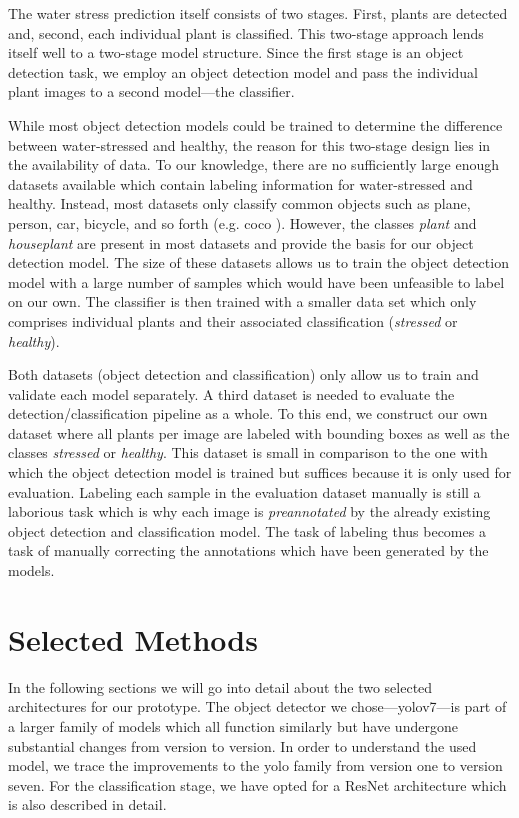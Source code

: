 \documentclass[final]{vutinfth} %
\begin{document}
The water stress prediction itself consists of two stages. First,
plants are detected and, second, each individual plant is
classified. This two-stage approach lends itself well to a two-stage
model structure. Since the first stage is an object detection task, we
employ an object detection model and pass the individual plant images
to a second model---the classifier.

While most object detection models could be trained to determine the
difference between water-stressed and healthy, the reason for this
two-stage design lies in the availability of data. To our knowledge,
there are no sufficiently large enough datasets available which
contain labeling information for water-stressed and healthy. Instead,
most datasets only classify common objects such as plane, person,
car, bicycle, and so forth (e.g. \gls{coco} \cite{lin2015}). However,
the classes \emph{plant} and \emph{houseplant} are present in most
datasets and provide the basis for our object detection model. The
size of these datasets allows us to train the object detection model
with a large number of samples which would have been unfeasible to
label on our own. The classifier is then trained with a smaller data
set which only comprises individual plants and their associated
classification (\emph{stressed} or \emph{healthy}).

Both datasets (object detection and classification) only allow us to
train and validate each model separately. A third dataset is needed to
evaluate the detection/classification pipeline as a whole. To this
end, we construct our own dataset where all plants per image are
labeled with bounding boxes as well as the classes \emph{stressed} or
\emph{healthy}. This dataset is small in comparison to the one with
which the object detection model is trained but suffices because it is
only used for evaluation. Labeling each sample in the evaluation
dataset manually is still a laborious task which is why each image is
\emph{preannotated} by the already existing object detection and
classification model. The task of labeling thus becomes a task of
manually correcting the annotations which have been generated by the
models.

\section{Selected Methods}
\label{sec:selected-methods}

In the following sections we will go into detail about the two
selected architectures for our prototype. The object detector we
chose---\gls{yolo}v7---is part of a larger family of models which all
function similarly but have undergone substantial changes from version
to version. In order to understand the used model, we trace the
improvements to the \gls{yolo} family from version one to version
seven. For the classification stage, we have opted for a ResNet
architecture which is also described in detail.
\end{document}

